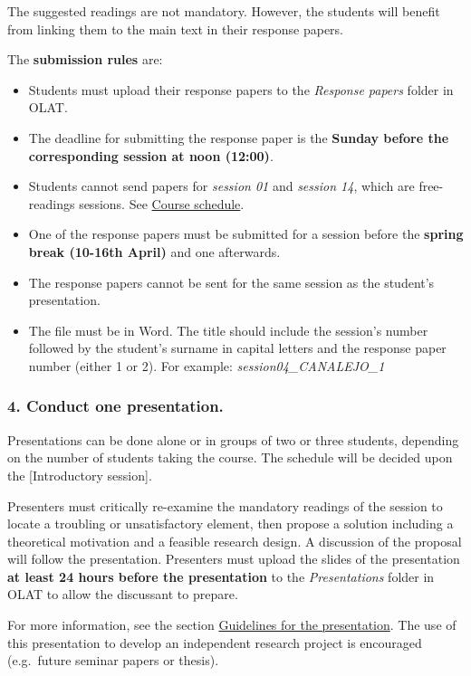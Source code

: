 \documentclass[
  12pt,
]{article}
\begin{document}
The suggested readings are not mandatory. However, the students will
benefit from linking them to the main text in their response papers.

The \textbf{submission rules} are:

\begin{itemize}
\item
  Students must upload their response papers to the \emph{Response
  papers} folder in OLAT.
\item
  The deadline for submitting the response paper is the \textbf{Sunday
  before the corresponding session at noon (12:00)}.
\item
  Students cannot send papers for \emph{session 01} and \emph{session
  14}, which are free-readings sessions. See
  \protect\hyperlink{course-schedule}{Course schedule}.
\item
  One of the response papers must be submitted for a session before the
  \textbf{spring break (10-16th April)} and one afterwards.
\item
  The response papers cannot be sent for the same session as the
  student's presentation.
\item
  The file must be in Word. The title should include the session's
  number followed by the student's surname in capital letters and the
  response paper number (either 1 or 2). For example:
  \emph{session04\_CANALEJO\_1}
\end{itemize}

\hypertarget{conduct-one-presentation.}{%
\subsubsection{4. Conduct one
presentation.}\label{conduct-one-presentation.}}

Presentations can be done alone or in groups of two or three students,
depending on the number of students taking the course. The schedule will
be decided upon the {[}Introductory session{]}.

Presenters must critically re-examine the mandatory readings of the
session to locate a troubling or unsatisfactory element, then propose a
solution including a theoretical motivation and a feasible research
design. A discussion of the proposal will follow the presentation.
Presenters must upload the slides of the presentation \textbf{at least
24 hours before the presentation} to the \emph{Presentations} folder in
OLAT to allow the discussant to prepare.

For more information, see the section
\protect\hyperlink{guidelines-for-the-presentation}{Guidelines for the
presentation}. The use of this presentation to develop an independent
research project is encouraged (e.g.~future seminar papers or thesis).
\end{document}
